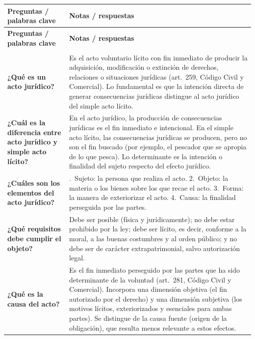 \documentclass[12pt,oneside]{book}
\begin{document}
\begin{center}
\begin{longtable}{
    >{\raggedright\arraybackslash}p{}
    >{\raggedright\arraybackslash}p{}
}
\toprule
\textbf{Preguntas / palabras clave} & \textbf{Notas / respuestas} \\
\midrule
\endfirsthead
\toprule
\textbf{Preguntas / palabras clave} & \textbf{Notas / respuestas} \\
\midrule
\endhead
\midrule
\multicolumn{2}{r}{\textit{Continúa en la página siguiente}} \\
\midrule
\endfoot
\bottomrule
\endlastfoot

\textbf{¿Qué es un acto jurídico?} &
Es el acto voluntario lícito con fin inmediato de producir la adquisición, modificación o extinción de derechos, relaciones o situaciones jurídicas (art.\ 259, Código Civil y Comercial). Lo fundamental es que la intención directa de generar consecuencias jurídicas distingue al acto jurídico del simple acto lícito. \\

\addlinespace

\textbf{¿Cuál es la diferencia entre acto jurídico y simple acto lícito?} &
En el acto jurídico, la producción de consecuencias jurídicas es el fin inmediato e intencional. En el simple acto lícito, las consecuencias jurídicas se producen, pero no son el fin buscado (por ejemplo, el pescador que se apropia de lo que pesca). Lo determinante es la intención o finalidad del sujeto respecto del efecto jurídico. \\

\addlinespace

\textbf{¿Cuáles son los elementos del acto jurídico?} &
1.\ Sujeto: la persona que realiza el acto. 2.\ Objeto: la materia o los bienes sobre los que recae el acto. 3.\ Forma: la manera de exteriorizar el acto. 4.\ Causa: la finalidad perseguida por las partes. \\

\addlinespace

\textbf{¿Qué requisitos debe cumplir el objeto?} &
Debe ser posible (física y jurídicamente); no debe estar prohibido por la ley; debe ser lícito, es decir, conforme a la moral, a las buenas costumbres y al orden público; y no debe ser de carácter extrapatrimonial, salvo autorización legal. \\

\addlinespace

\textbf{¿Qué es la causa del acto?} &
Es el fin inmediato perseguido por las partes que ha sido determinante de la voluntad (art.\ 281, Código Civil y Comercial). Incorpora una dimensión objetiva (el fin autorizado por el derecho) y una dimensión subjetiva (los motivos lícitos, exteriorizados y esenciales para ambas partes). Se distingue de la causa fuente (origen de la obligación), que resulta menos relevante a estos efectos. \\


\end{longtable}
\end{center}
\end{document}
